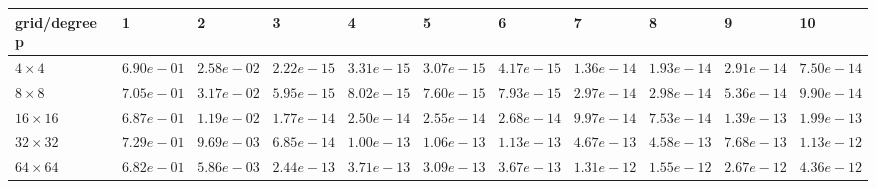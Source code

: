 \begin{tabular}{lllllllllll}
\hline
 grid/degree p   & 1          & 2          & 3          & 4          & 5          & 6          & 7          & 8          & 9          & 10         \\
\hline
 $4 \times 4$    & $6.90e-01$ & $2.58e-02$ & $2.22e-15$ & $3.31e-15$ & $3.07e-15$ & $4.17e-15$ & $1.36e-14$ & $1.93e-14$ & $2.91e-14$ & $7.50e-14$ \\
 $8 \times 8$    & $7.05e-01$ & $3.17e-02$ & $5.95e-15$ & $8.02e-15$ & $7.60e-15$ & $7.93e-15$ & $2.97e-14$ & $2.98e-14$ & $5.36e-14$ & $9.90e-14$ \\
 $16 \times 16$  & $6.87e-01$ & $1.19e-02$ & $1.77e-14$ & $2.50e-14$ & $2.55e-14$ & $2.68e-14$ & $9.97e-14$ & $7.53e-14$ & $1.39e-13$ & $1.99e-13$ \\
 $32 \times 32$  & $7.29e-01$ & $9.69e-03$ & $6.85e-14$ & $1.00e-13$ & $1.06e-13$ & $1.13e-13$ & $4.67e-13$ & $4.58e-13$ & $7.68e-13$ & $1.13e-12$ \\
 $64 \times 64$  & $6.82e-01$ & $5.86e-03$ & $2.44e-13$ & $3.71e-13$ & $3.09e-13$ & $3.67e-13$ & $1.31e-12$ & $1.55e-12$ & $2.67e-12$ & $4.36e-12$ \\
\hline
\end{tabular}